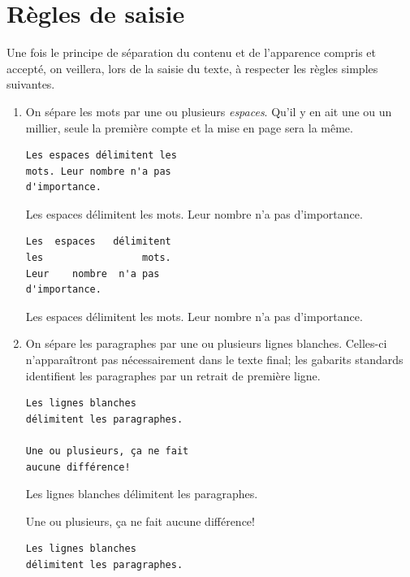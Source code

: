 \section{Règles de saisie}
\label{sec:bases:saisie}

Une fois le principe de séparation du contenu et de l'apparence
compris et accepté, on veillera, lors de la saisie du texte, à
respecter les règles simples suivantes.
\begin{enumerate}
\item On sépare les mots par une ou plusieurs \emph{espaces}. Qu'il y
  en ait une ou un millier, seule la première compte et la mise en
  page sera la même.
  \begin{demo}
    \begin{texample}
\begin{lstlisting}
Les espaces délimitent les
mots. Leur nombre n'a pas
d'importance.
\end{lstlisting}
      \producing
      Les espaces délimitent les
      mots. Leur nombre n'a pas
      d'importance.
    \end{texample}
    \begin{texample}
\begin{lstlisting}[showstringspaces=true]
Les  espaces   délimitent
les                 mots.
Leur    nombre  n'a pas
d'importance.
\end{lstlisting}
      \producing
      Les  espaces   délimitent
      les                 mots.
      Leur    nombre  n'a pas
      d'importance.
    \end{texample}
  \end{demo}
%
\item On sépare les paragraphes par une ou plusieurs lignes blanches.
  Celles-ci n'apparaîtront pas nécessairement dans le texte final; les
  gabarits standards identifient les paragraphes par un retrait de
  première ligne.
  \begin{demo}
    \begin{texample}
\begin{lstlisting}
Les lignes blanches
délimitent les paragraphes.

Une ou plusieurs, ça ne fait
aucune différence!
\end{lstlisting}
      \producing
Les lignes blanches
délimitent les
paragraphes.

        Une ou plusieurs, ça ne fait aucune différence!
    \end{texample}
\begin{texample}
\begin{lstlisting}
Les lignes blanches
délimitent les paragraphes.




\end{lstlisting}
\end{texample}
\end{demo}
\end{enumerate}
